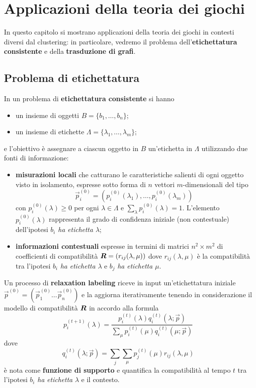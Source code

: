 \chapter{Applicazioni della teoria dei giochi}

In questo capitolo si mostrano applicazioni della teoria dei giochi in contesti diversi dal clustering: in particolare, vedremo il problema dell'\textbf{etichettatura consistente} e della \textbf{trasduzione di grafi}.

\section{Problema di etichettatura}
\label{sec:problema_di_etichettatura}

In un problema di \textbf{etichettatura consistente} si hanno
\begin{itemize}
	\item un insieme di oggetti $B= \{b_1, \dots, b_n\}$;
	\item un insieme di etichette $\Lambda = \{\lambda_1, \dots, \lambda_m\}$;
\end{itemize} 
e l'obiettivo è assegnare a ciascun oggetto in $B$ un'etichetta in $\Lambda$ utilizzando due fonti di informazione:
\begin{itemize}
	\item \textbf{misurazioni locali} che catturano le caratteristiche salienti di ogni oggetto visto in isolamento, espresse sotto forma di $n$ vettori $m$-dimensionali del tipo
	\begin{displaymath}
		\vec{p}_i^{(0)} = (p_i^{(0)}(\lambda_1), \dots, p_i^{(0)}(\lambda_m))
	\end{displaymath}
	con $p_i^{(0)}(\lambda) \geq 0$ per ogni $\lambda \in \Lambda$ e $\sum_{\lambda} p_i^{(0)}(\lambda) = 1$. L'elemento $p_i^{(0)}(\lambda)$ rappresenta il grado di confidenza iniziale (non contestuale) dell'ipotesi \emph{$b_i$ ha etichetta $\lambda$};
	\item \textbf{informazioni contestuali} espresse in termini di matrici $n^2 \times m^2$ di coefficienti di compatibilità $\mat{R} = (r_{ij}(\lambda, \mu))$ dove $r_{ij}(\lambda, \mu)$ è la compatibilità tra l'ipotesi \emph{$b_i$ ha etichetta $\lambda$} e \emph{$b_j$ ha etichetta $\mu$}.
\end{itemize}
Un processo di \textbf{relaxation labeling} riceve in input un'etichettatura iniziale $\vec{p}^{(0)} = (\vec{p}_1^{(0)} \dots \vec{p}_n^{(0)})$ e la aggiorna iterativamente tenendo in considerazione il modello di compatibilità $\mat{R}$ in accordo alla formula
\begin{displaymath}
	p_i^{(t + 1)}(\lambda) = \frac{p_i^{(t)}(\lambda) q_i^{(t)}(\lambda; \vec{p})}{\sum_\mu p_i^{(t)}(\mu) q_i^{(t)}(\mu; \vec{p})}
\end{displaymath}
dove
\begin{displaymath}
	q_i^{(t)}(\lambda; \vec{p}) = \sum_j \sum_\mu p_j^{(t)}(\mu) r_{ij}(\lambda, \mu)
\end{displaymath}
è nota come \textbf{funzione di supporto} e quantifica la compatibilità al tempo $t$ tra l'ipotesi \emph{$b_i$ ha etichetta $\lambda$} e il contesto.

